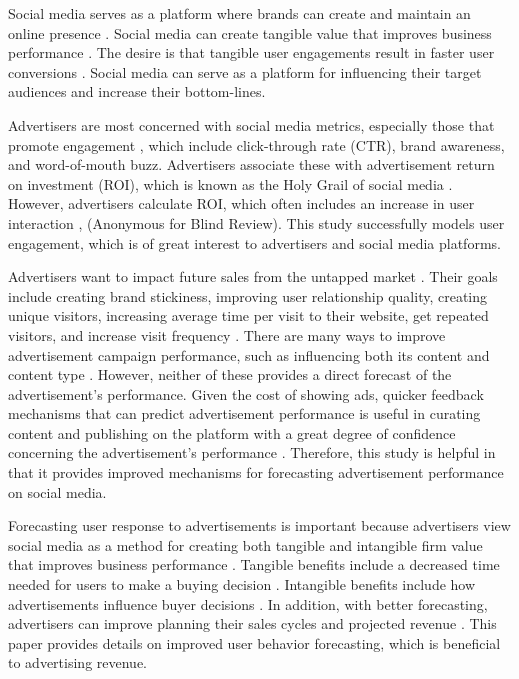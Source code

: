 \documentclass[mksc,blindrev]{informs3} %
\begin{document}
Social media serves as a platform where brands can create and maintain an online presence \cite{Greenwood2016}. Social media can create tangible value that improves business performance \cite{Barreto2013}. The desire is that tangible user engagements result in faster user conversions \cite{Barreto2013}. Social media can serve as a platform for influencing their target audiences and increase their bottom-lines.

Advertisers are most concerned with social media metrics, especially those that promote engagement \cite{Tiago2014}, which include click-through rate (CTR), brand awareness, and word-of-mouth buzz. Advertisers associate these with advertisement return on investment (ROI), which is known as the Holy Grail of social media \cite{Fisher2009}. However, advertisers calculate ROI, which often includes an increase in user interaction \cite{Romero2011}, (Anonymous for Blind Review). This study successfully models user engagement, which is of great interest to advertisers and social media platforms.  

Advertisers want to impact future sales from the untapped market \cite{Guo2020}. Their goals include creating brand stickiness, improving user relationship quality, creating unique visitors, increasing average time per visit to their website, get repeated visitors, and increase visit frequency \cite{Bhat2002}. There are many ways to improve advertisement campaign performance, such as influencing both its content and content type \cite{Imsa2020}. However, neither of these provides a direct forecast of the advertisement's performance. Given the cost of showing ads, quicker feedback mechanisms that can predict advertisement performance is useful in curating content and publishing on the platform with a great degree of confidence concerning the advertisement's performance \cite{Hu2016}. Therefore, this study is helpful in that it provides improved mechanisms for forecasting advertisement performance on social media.

Forecasting user response to advertisements is important because advertisers view social media as a method for creating both tangible and intangible firm value that improves business performance \cite{Barreto2013}. Tangible benefits include a decreased time needed for users to make a buying decision \cite{Barreto2013}. Intangible benefits include how advertisements influence buyer decisions \cite{Barreto2013}. In addition, with better forecasting, advertisers can improve planning their sales cycles and projected revenue \cite{Imsa2020}. This paper provides details on improved user behavior forecasting, which is beneficial to advertising revenue. 
\end{document}
